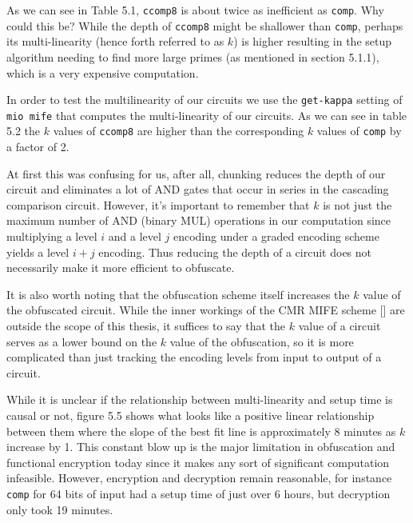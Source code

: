 \documentclass[12pt,twoside]{reedthesis}
\begin{document}
\par As we can see in Table 5.1, \texttt{ccomp8} is about twice as inefficient as \texttt{comp}. Why could this be? While the depth of \texttt{ccomp8} might be shallower than \texttt{comp}, perhaps its multi-linearity (hence forth referred to as $k$) is higher resulting in the setup algorithm needing to find more large primes (as mentioned in section 5.1.1), which is a very expensive computation. 

\par In order to test the multilinearity of our circuits we use the \texttt{get-kappa} setting of \texttt{mio mife} that computes the multi-linearity of our circuits. As we can see in table 5.2 the $k$ values of \texttt{ccomp8} are higher than the corresponding $k$ values of \texttt{comp} by a factor of 2. 
\par At first this was confusing for us, after all, chunking reduces the depth of our circuit and eliminates a lot of AND gates that occur in series in the cascading comparison circuit. However, it's important to remember that $k$ is not just the maximum number of AND (binary MUL) operations in our computation since multiplying a level $i$ and a level $j$ encoding under a graded encoding scheme yields a level $i+j$ encoding. Thus reducing the depth of a circuit does not necessarily make it more efficient to obfuscate.
\par It is also worth noting that the obfuscation scheme itself increases the $k$ value of the obfuscated circuit. While the inner workings of the CMR MIFE scheme [\cite{5genc}] are outside the scope of this thesis, it suffices to say that the $k$ value of a circuit serves as a lower bound on the $k$ value of the obfuscation, so it is more complicated than just tracking the encoding levels from input to output of a circuit.
\par While it is unclear if the relationship between multi-linearity and setup time is causal or not, figure 5.5 shows what looks like a positive linear relationship between them where the slope of the best fit line is approximately 8 minutes as $k$ increase by 1. This constant blow up is the major limitation in obfuscation and functional encryption today since it makes any sort of significant computation infeasible. However, encryption and decryption remain reasonable, for instance \texttt{comp} for 64 bits of input had a setup time of just over 6 hours, but decryption only took 19 minutes. 
\end{document}
